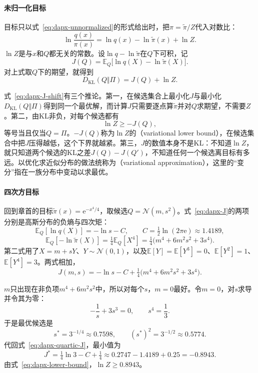 \paragraph{未归一化目标}
目标只以式~\eqref{eq:dapx-unnormalized}的形式给出时，把$\pi=\widetilde{\pi}/Z$代入对数比：
\[
 \ln\frac{q(x)}{\pi(x)}=\ln q(x)-\ln\widetilde{\pi}(x)+\ln Z .
\]
$\ln Z$是与$x$和$Q$都无关的常数。设$\ln q-\ln\widetilde{\pi}$在$Q$下可积，记
\begin{equation}
 J(Q)=\mathbb{E}_{Q}\bigl[\ln q(X)-\ln\widetilde{\pi}(X)\bigr] .
 \label{eq:dapx-J}
\end{equation}
对上式取$Q$下的期望，就得到
\begin{equation}
 D_{\mathrm{KL}}(Q\Vert\Pi)=J(Q)+\ln Z .
 \label{eq:dapx-J-shift}
\end{equation}

式~\eqref{eq:dapx-J-shift}有三个推论。第一，在候选集合上最小化$J$与最小化$D_{\mathrm{KL}}(Q\Vert\Pi)$得到同一个最优解，而计算$J$只需要逐点算$\widetilde{\pi}$并对$Q$求期望，不需要$Z$。第二，由KL非负，对每个候选都有
\begin{equation}
 \ln Z\geq-J(Q) ,
 \label{eq:dapx-lower-bound}
\end{equation}
等号当且仅当$Q=\Pi$。$-J(Q)$称为$\ln Z$的（variational lower bound），在候选集合中把$J$压得越低，这个下界就越紧。第三，$J$的数值本身不是KL：不知道$\ln Z$，就只知道两个候选的KL之差$J(Q)-J(Q')$，不知道任何一个候选离目标有多远。以优化求近似分布的做法统称为（variational approximation），这里的“变分”指在一族分布中变动以求最优。

\paragraph{四次方目标}
回到章首的目标$\widetilde{\pi}(x)=\mathrm{e}^{-x^{4}/4}$，取候选$Q=\mathcal{N}(m,s^{2})$。式~\eqref{eq:dapx-J}的两项分别是高斯分布的负熵与四次矩：
\[
 \mathbb{E}_{Q}[\ln q(X)]=-\ln s-C,\qquad C=\tfrac12\ln(2\pi\mathrm{e})\approx1.4189 ,
\]
\[
 \mathbb{E}_{Q}[-\ln\widetilde{\pi}(X)]=\tfrac14\mathbb{E}_{Q}[X^{4}]=\tfrac14\bigl(m^{4}+6m^{2}s^{2}+3s^{4}\bigr) .
\]
第二式用了$X=m+sY$、$Y\sim\mathcal{N}(0,1)$，以及$\mathbb{E}[Y]=\mathbb{E}[Y^{3}]=0$、$\mathbb{E}[Y^{2}]=1$、$\mathbb{E}[Y^{4}]=3$。两式相加，
\begin{equation}
 J(m,s)=-\ln s-C+\tfrac14\bigl(m^{4}+6m^{2}s^{2}+3s^{4}\bigr) .
 \label{eq:dapx-quartic-J}
\end{equation}

$m$只出现在非负项$m^{4}+6m^{2}s^{2}$中，所以对每个$s$，$m=0$最好。令$m=0$，对$s$求导并令其为零：
\[
 -\frac1s+3s^{3}=0,\qquad s^{4}=\frac13 .
\]
于是最优候选是
\[
 s^{*}=3^{-1/4}\approx0.7598,\qquad (s^{*})^{2}=3^{-1/2}\approx0.5774 .
\]
代回式~\eqref{eq:dapx-quartic-J}，最小值为
\[
 J^{*}=\tfrac14\ln3-C+\tfrac14\approx0.2747-1.4189+0.25=-0.8943 .
\]
由式~\eqref{eq:dapx-lower-bound}，$\ln Z\geq0.8943$。

